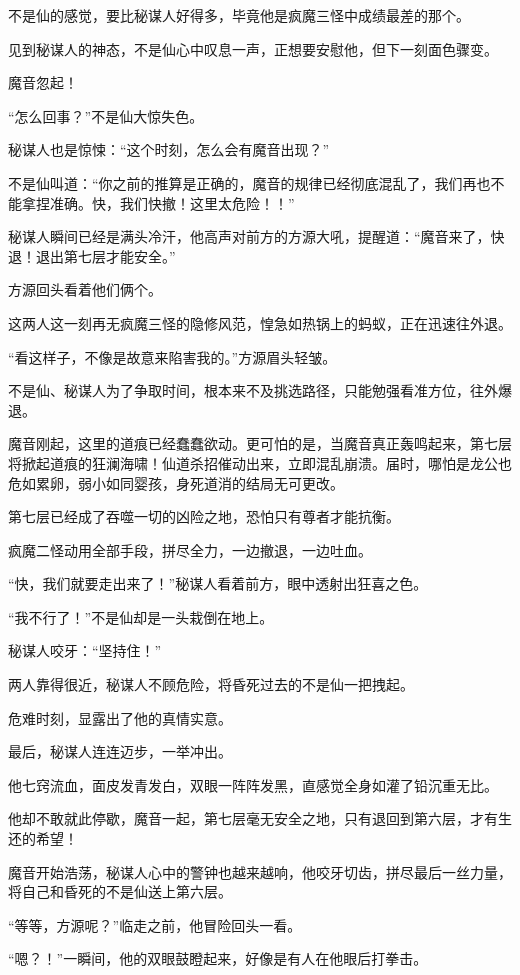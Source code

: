 \begin{this_body}
不是仙的感觉，要比秘谋人好得多，毕竟他是疯魔三怪中成绩最差的那个。

见到秘谋人的神态，不是仙心中叹息一声，正想要安慰他，但下一刻面色骤变。

魔音忽起！

“怎么回事？”不是仙大惊失色。

秘谋人也是惊悚：“这个时刻，怎么会有魔音出现？”

不是仙叫道：“你之前的推算是正确的，魔音的规律已经彻底混乱了，我们再也不能拿捏准确。快，我们快撤！这里太危险！！”

秘谋人瞬间已经是满头冷汗，他高声对前方的方源大吼，提醒道：“魔音来了，快退！退出第七层才能安全。”

方源回头看着他们俩个。

这两人这一刻再无疯魔三怪的隐修风范，惶急如热锅上的蚂蚁，正在迅速往外退。

“看这样子，不像是故意来陷害我的。”方源眉头轻皱。

不是仙、秘谋人为了争取时间，根本来不及挑选路径，只能勉强看准方位，往外爆退。

魔音刚起，这里的道痕已经蠢蠢欲动。更可怕的是，当魔音真正轰鸣起来，第七层将掀起道痕的狂澜海啸！仙道杀招催动出来，立即混乱崩溃。届时，哪怕是龙公也危如累卵，弱小如同婴孩，身死道消的结局无可更改。

第七层已经成了吞噬一切的凶险之地，恐怕只有尊者才能抗衡。

疯魔二怪动用全部手段，拼尽全力，一边撤退，一边吐血。

“快，我们就要走出来了！”秘谋人看着前方，眼中透射出狂喜之色。

“我不行了！”不是仙却是一头栽倒在地上。

秘谋人咬牙：“坚持住！”

两人靠得很近，秘谋人不顾危险，将昏死过去的不是仙一把拽起。

危难时刻，显露出了他的真情实意。

最后，秘谋人连连迈步，一举冲出。

他七窍流血，面皮发青发白，双眼一阵阵发黑，直感觉全身如灌了铅沉重无比。

他却不敢就此停歇，魔音一起，第七层毫无安全之地，只有退回到第六层，才有生还的希望！

魔音开始浩荡，秘谋人心中的警钟也越来越响，他咬牙切齿，拼尽最后一丝力量，将自己和昏死的不是仙送上第六层。

“等等，方源呢？”临走之前，他冒险回头一看。

“嗯？！”一瞬间，他的双眼鼓瞪起来，好像是有人在他眼后打拳击。


\end{this_body}
